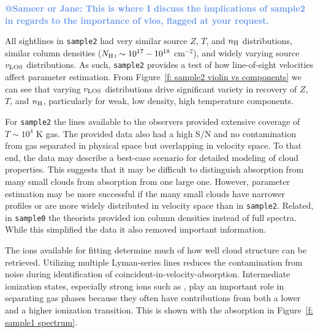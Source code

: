 \documentclass[fleqn,usenatbib]{mnras}
\makeatletter
\newcommand{\atsameer}[1]{\textcolor{CornflowerBlue}{\textbf{@Sameer or Jane: #1}}}
\makeatother
\begin{document}
\atsameer{This is where I discuss the implications of sample2 in regards to the importance of vlos, flagged at your request.}

All sightlines in \texttt{sample2} had very similar source $Z$, $T$, and $n_{\rm H}$ distributions,
similar column densities ($N_{\ion{H}{I}} \sim 10^{17}-10^{18}$ cm$^{-2}$),
and widely varying source $v_{\rm LOS}$ distributions. 
As such, \texttt{sample2} provides a test of how line-of-sight velocities affect parameter estimation.
From Figure~\ref{f: sample2 violin vs components} we can see that varying $v_{\rm LOS}$ distributions drive significant variety in recovery of $Z$, $T$, and $n_{\rm H}$, particularly for weak, low density, high temperature components.

For \texttt{sample2} the lines available to the observers provided extensive coverage of $T \sim 10^4$ K gas.
The provided data also had a high S/N and no contamination from gas separated in physical space but overlapping in velocity space.
To that end, the data may describe a best-case scenario for detailed modeling of cloud properties.
This suggests that it may be difficult to distinguish absorption from many small clouds from absorption from one large one.
However, parameter estimation may be more successful if the many small clouds have narrower profiles or are more widely distributed in velocity space than in \texttt{sample2}.
Related, in \texttt{sample0} the theorists provided ion column densities instead of full spectra.
While this simplified the data it also removed important information.


The ions available for fitting determine much of how well cloud structure can be retrieved.
Utilizing multiple Lyman-series lines reduces the contamination from noise during identification of coincident-in-velocity-absorption.
Intermediate ionization states, especially strong ions such as , play an important role in separating gas phases because they often have contributions from both a lower and a higher ionization transition.
This is shown with the  absorption in Figure~\ref{f: sample1 spectrum}.
\end{document}
